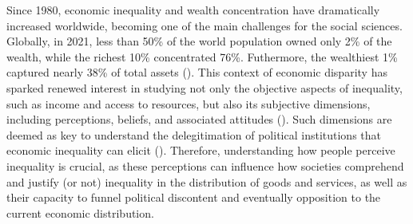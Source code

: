 \documentclass[
  12pt,
]{article}
\begin{document}
Since 1980, economic inequality and wealth concentration have
dramatically increased worldwide, becoming one of the main challenges
for the social sciences. Globally, in 2021, less than 50\% of the world
population owned only 2\% of the wealth, while the richest 10\%
concentrated 76\%. Futhermore, the wealthiest 1\% captured nearly 38\%
of total assets (). This context of economic disparity has sparked renewed interest
in studying not only the objective aspects of inequality, such as income
and access to resources, but also its subjective dimensions, including
perceptions, beliefs, and associated attitudes
(). Such dimensions
are deemed as key to understand the delegitimation of political
institutions that economic inequality can elicit
().
Therefore, understanding how people perceive inequality is crucial, as
these perceptions can influence how societies comprehend and justify (or
not) inequality in the distribution of goods and services, as well as
their capacity to funnel political discontent and eventually opposition
to the current economic distribution.
\end{document}
